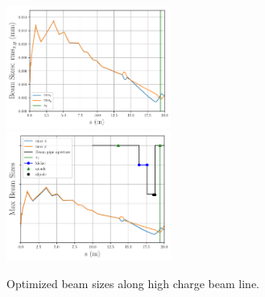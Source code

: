 \begin{figure}
	\includegraphics[width=0.48\textwidth]{../pareto_stat_plots/xyrms-zrms_newobj}\\
	\vspace{2em}
	\includegraphics[width=0.48\textwidth]{../pareto_stat_plots/xy-max-min-zrms_newobj}
	\caption{Optimized beam sizes along high charge beam line.}
	\label{fig:stat}
\end{figure}








